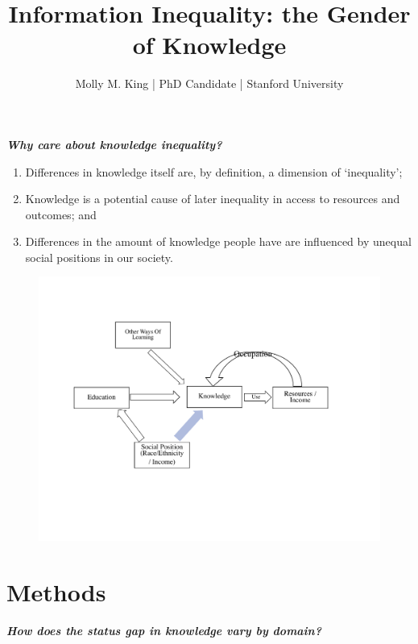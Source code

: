 \documentclass[]{article}
\begin{document}
 \title{\vspace{-1.0cm}Information Inequality: the Gender of Knowledge}
 \date{}
 \author{Molly M. King  |  PhD Candidate  |  Stanford University}

 \maketitle
\thispagestyle{fancy}

\emph{\textbf{Why care about knowledge inequality?}}

\begin{enumerate}
  \item{Differences in knowledge itself are, by definition, a dimension of `inequality';}
  \item{Knowledge is a potential cause of later inequality in access to resources and outcomes; and}
  \item{Differences in the amount of knowledge people have are influenced by unequal social positions in our society.}
\end{enumerate}


    \begin{figure}[htb]
      \begin{center}
      \includegraphics[width=0.7\linewidth]{"Theoretical Model Drawing"}
      \end{center}
    \end{figure}


\section{Methods}\label{methods}

\emph{\textbf{How does the status gap in knowledge vary by domain?}}

\vspace{7mm}
\end{document}
